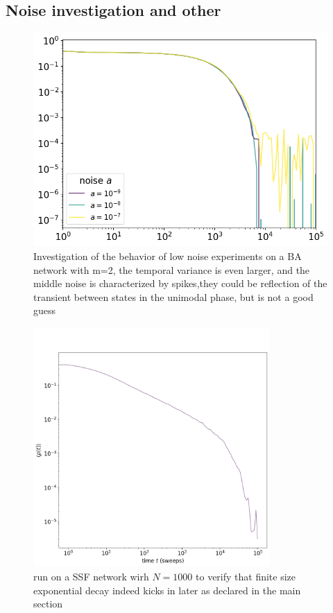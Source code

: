 \begin{appendices}
\section{Noise investigation and other}

\begin{figure}[htbp]
  \centering
  \includegraphics[width=14cm,keepaspectratio]{images/BA_low_noise.png}
  \caption{Investigation of the behavior of low noise experiments on a BA network with m=2, the temporal variance is even larger, and the middle noise is characterized by spikes,they could be reflection of the transient between states in the unimodal phase, but is not a good guess}
  
\end{figure}
\begin{figure}[htbp]
  \centering
  \includegraphics[width=9cm,keepaspectratio]{images/quick_check.png}
  \caption{run on a SSF network wirh $N=1000$ to verify that finite size exponential decay indeed kicks in later as declared in the main section}
  

\end{figure}
\end{appendices}
